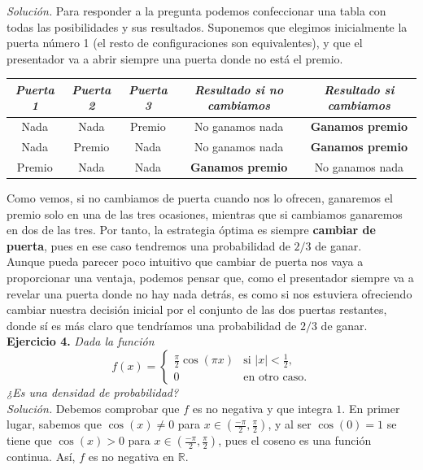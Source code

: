 \documentclass[11pt,a4paper]{article}
\begin{document}
\textit{Solución.} Para responder a la pregunta podemos confeccionar una tabla con todas las posibilidades y sus resultados. Suponemos que elegimos inicialmente la puerta número 1 (el resto de configuraciones son equivalentes), y que el presentador va a abrir siempre una puerta donde no está el premio.

\begin{table}[h!]
  \centering
  \begin{tabular}{ccccc}
    \textit{Puerta 1} & \textit{Puerta 2} & \textit{Puerta 3} & \textit{Resultado si no cambiamos} & \textit{Resultado si cambiamos}\\
    \hline
    Nada & Nada & Premio & No ganamos nada & \textbf{Ganamos premio}\\
    Nada & Premio & Nada & No ganamos nada & \textbf{Ganamos premio}\\
    Premio & Nada & Nada & \textbf{Ganamos premio} & No ganamos nada
  \end{tabular}
\end{table}

Como vemos, si no cambiamos de puerta cuando nos lo ofrecen, ganaremos el premio solo en una de las tres ocasiones, mientras que si cambiamos ganaremos en dos de las tres. Por tanto, la estrategia óptima es siempre \textbf{cambiar de puerta}, pues en ese caso tendremos una probabilidad de $2/3$ de ganar.\\

Aunque pueda parecer poco intuitivo que cambiar de puerta nos vaya a proporcionar una ventaja, podemos pensar que, como el presentador siempre va a revelar una puerta donde no hay nada detrás, es como si nos estuviera ofreciendo cambiar nuestra decisión inicial por el conjunto de las dos puertas restantes, donde sí es más claro que tendríamos una probabilidad de $2/3$ de ganar.\\

\textbf{Ejercicio 4.} \textit{Dada la función}
\[
f(x) = \begin{cases}
  \frac{\pi}{2}\cos(\pi x) & \text{si } |x|<\frac{1}{2},\\
  0 & \text{en otro caso}.
\end{cases}
\]
\textit{¿Es una densidad de probabilidad?}\\

\textit{Solución.} Debemos comprobar que $f$ es no negativa y que integra $1$. En primer lugar, sabemos que $\cos(x)\neq 0$ para $x\in (\frac{-\pi}{2}, \frac{\pi}{2})$, y al ser $\cos(0)=1$ se tiene que $\cos(x) > 0$ para $x \in (\frac{-\pi}{2}, \frac{\pi}{2})$, pues el coseno es una función continua. Así, $f$ es no negativa en $\mathbb{R}$.\\
\end{document}
